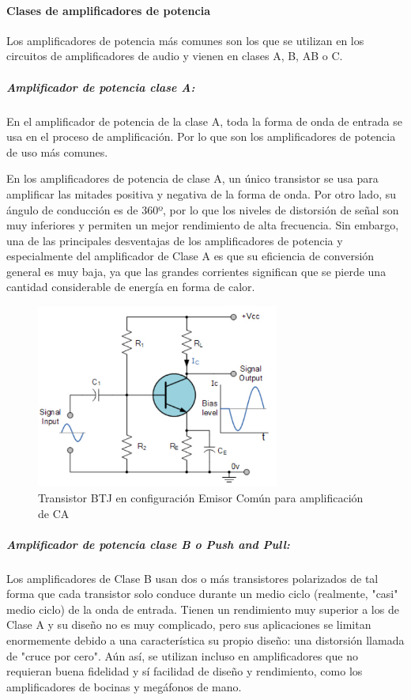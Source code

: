 \paragraph{Clases de amplificadores de potencia}

Los amplificadores de potencia más comunes son los que se utilizan en los circuitos de amplificadores de audio y vienen en clases A, B, AB o C.

\subparagraph{Amplificador de potencia clase A:}

En el amplificador de potencia de la clase A, toda la forma de onda de entrada se usa en el proceso de amplificación. Por lo que son los amplificadores de potencia de uso más comunes.

En los amplificadores de potencia de clase A, un único transistor se usa para amplificar las mitades positiva y negativa de la forma de onda. Por otro lado, su ángulo de conducción es de 360º, por lo que los niveles de distorsión de señal son muy inferiores y permiten un mejor rendimiento de alta frecuencia. Sin embargo, una de las principales desventajas de los amplificadores de potencia y especialmente del amplificador de Clase A es que su eficiencia de conversión general es muy baja, ya que las grandes corrientes significan que se pierde una cantidad considerable de energía en forma de calor.

\begin{figure}[H]
    \centering
    \includegraphics[width=8cm]{Imagenes/potencia_bjt.jpg}
    \caption{Transistor BTJ en configuración Emisor Común para amplificación de CA}
    \label{fig:potencia}
\end{figure}

\subparagraph{Amplificador de potencia clase B o Push and Pull:}

Los amplificadores de Clase B usan dos o más transistores polarizados de tal forma que cada transistor solo conduce durante un medio ciclo (realmente, "casi" medio ciclo) de la onda de entrada. Tienen un rendimiento muy superior a los de Clase A y su diseño no es muy complicado, pero sus aplicaciones se limitan enormemente debido a una característica su propio diseño: una distorsión llamada de "cruce por cero". Aún así, se utilizan incluso en amplificadores que no requieran buena fidelidad y sí facilidad de diseño y rendimiento, como los amplificadores de bocinas y megáfonos de mano.

